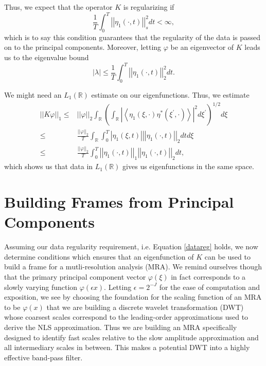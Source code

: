 \documentclass[a4paper,11pt]{article}
\newcommand{\gnorm}[1]{\left|\left| #1\right|\right|}
\begin{document}
Thus, we expect that the operator $K$ is regularizing if 
\begin{equation}
\frac{1}{T}\int_{0}^{T}\gnorm{\eta_{1}(\cdot,t)}^{2}_{s}dt < \infty, 
\label{datareg}
\end{equation}
which is to say this condition guarantees that the regularity of the data is passed on to the principal components.  Moreover, letting $\varphi$ be an eigenvector of $K$ leads us to the eigenvalue bound 
\[
\left|\lambda \right| \leq \frac{1}{T}\int_{0}^{T}\gnorm{\eta_{1}(\cdot,t)}^{2}_{2}dt.
\]

We might need an $L_{1}(\mathbb{R})$ estimate on our eigenfunctions.  Thus, we estimate
\begin{align*}
\gnorm{K\varphi}_{1} \leq & \gnorm{\varphi}_{2}\int_{\mathbb{R}}\left(\int_{\mathbb{R}}\left|\left<\eta_{1}(\xi,\cdot)\eta^{\ast}(\xi^{'},\cdot)\right>\right|^{2}d\xi^{'}\right)^{1/2}d\xi\\
\leq & \frac{\gnorm{\varphi}_{2}}{T}\int_{\mathbb{R}}\int_{0}^{T}\left|\eta_{1}(\xi,t)\right| \gnorm{\eta_{1}(\cdot,t)}_{2}dt d\xi \\
\leq & \frac{\gnorm{\varphi}_{2}}{T}\int_{0}^{T}\gnorm{\eta_{1}(\cdot,t)}_{1} \gnorm{\eta_{1}(\cdot,t)}_{2}dt, 
\end{align*}
which shows us that data in $L_{1}(\mathbb{R})$ gives us eigenfunctions in the same space.  
\section*{Building Frames from Principal Components}
Assuming our data regularity requirement, i.e. Equation \eqref{datareg} holds, we now determine conditions which ensures that an eigenfunction of $K$ can be used to build a frame for a mutli-resolution analysis (MRA).  We remind ourselves though that the primary principal component vector $\varphi(\xi)$ in fact corresponds to a slowly varying function $\varphi(\epsilon x)$.  Letting $\epsilon = 2^{-J}$ for the ease of computation and exposition, we see by choosing the foundation for the scaling function of an MRA to be $\varphi(x)$ that we are building a discrete wavelet transformation (DWT) whose coarsest scales correspond to the leading-order approximations used to derive the NLS approximation.  Thus we are building an MRA specifically designed to identify fast scales relative to the slow amplitude approximation and all intermediary scales in between.  This makes a potential DWT into a highly effective band-pass filter.  
\end{document}
